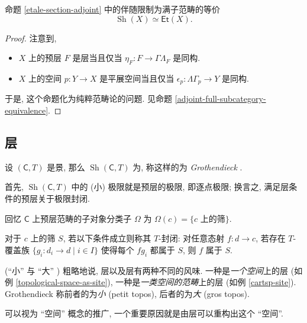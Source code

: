 \begin{prop}
    {}
    命题 \ref{etale-section-adjoint} 中的伴随限制为满子范畴的等价
    $$
    \operatorname{Sh}(X) \simeq \mathsf {Et}(X).
    $$
\end{prop}

\begin{proof}
	注意到,
	\begin{itemize}
		\item $X$ 上的预层 $F$ 是层当且仅当 $\eta_F\colon F \to \Gamma\Lambda_F$ 是同构.
		\item $X$ 上的空间 $p\colon Y \to X$ 是平展空间当且仅当 $\epsilon_p \colon \Lambda\Gamma_p \to Y$ 是同构.
	\end{itemize}
	
	于是, 这个命题化为纯粹范畴论的问题. 见命题 \ref{adjoint-full-subcategory-equivalence}.
\end{proof}

\subsection{层\topos{}}

\begin{propdef}
	{}
	设 $(\mathsf C,T)$ 是景, 那么 $\operatorname{Sh}(\mathsf C,T)$ 为\topos{},
	称这样的\topos{}为 \emph{Grothendieck \topos{}}.
\end{propdef}

首先, $\operatorname{Sh}(\mathsf C,T)$ 中的 (小) 极限就是预层的极限, 即逐点极限;
换言之, 满足层条件的预层关于极限封闭.

回忆 $\mathsf C$ 上预层范畴的子对象分类子 $\Omega$ 为 $\Omega(c) = \{\text{$c$ 上的筛}\}$.

对于 $c$ 上的筛 $S$, 若以下条件成立则称其 $T$-封闭:
对任意态射 $f \colon d \to c$,
若存在 $T$-覆盖族 $\{g_i \colon d_i \to d \mid i\in I\}$
使得每个 $fg_i$ 都属于 $S$, 则 $f$ 属于 $S$.


\begin{remark}
	{(``小'' \topos{}与 ``大'' \topos{})}
	粗略地说, 层以及层\topos{}有两种不同的风味.
	一种是\emph{一个空间}上的层 (如例 \ref{topological-space-as-site}),
	一种是\emph{一类空间的范畴}上的层 (如例 \ref{cartsp-site}).
	Grothendieck 称前者的\topos{}为\emph{小\topos{}} (petit topos),
	后者的\topos{}为\emph{大\topos{}} (gros topos).
\end{remark}

\topos{}可以视为 ``空间'' 概念的推广, 一个重要原因就是由层\topos{}可以重构出这个 ``空间''.

